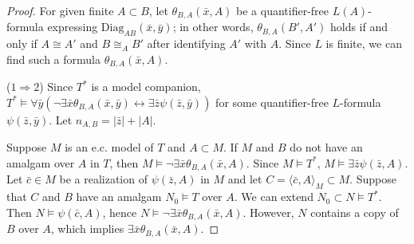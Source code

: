 \documentclass[11pt,reqno]{article}
\theoremstyle{definition}
\theoremstyle{remark}
\begin{document}
\begin{proof}
    For given finite $A\subset B$, let $\theta_{B,A}(\bar x,A)$ be a quantifier-free $L(A)$-formula expressing $\mathrm{Diag}_{AB}(\bar x,\bar y)$; in other words, $\theta_{B,A}(B',A')$ holds if and only if $A\cong A'$ and $B \cong_A B'$ after identifying $A'$ with $A$. Since $L$ is finite, we can find such a formula $\theta_{B,A}(\bar x,A)$.

    ($1\Rightarrow 2$)
    Since $T^*$ is a model companion, $T^*\models \forall \bar y (\neg\exists \bar x\theta_{B,A}(\bar x,\bar y) \leftrightarrow  \exists \bar z \psi(\bar z, \bar y))$ for some quantifier-free $L$-formula $\psi(\bar z,\bar y)$.
    Let $n_{A,B}=|\bar z|+|A|$.

    Suppose $M$ is an e.c. model of $T$ and $A\subset M$.
    If $M$ and $B$ do not have an amalgam over $A$ in $T$, then $M\models \neg \exists \bar x\theta_{B,A}(\bar x,A)$.
    Since $M\models T^*$, $M\models \exists \bar z\psi(\bar z,A)$.
    Let $\bar c\in M$ be a realization of $\psi(\bar z,A)$ in $M$ and let $C=\langle \bar c,A\rangle_M\subset M$.
    Suppose that $C$ and $B$ have an amalgam $N_0\models T$ over $A$. We can extend $N_0\subset N\models T^*$.
    Then $N\models \psi(\bar c, A)$, hence $N\models \neg\exists \bar x\theta_{B,A}(\bar x,A)$. 
    However, $N$ contains a copy of $B$ over $A$, which implies $\exists \bar x \theta_{B,A}(\bar x,A)$. 


\end{proof}
\end{document}
